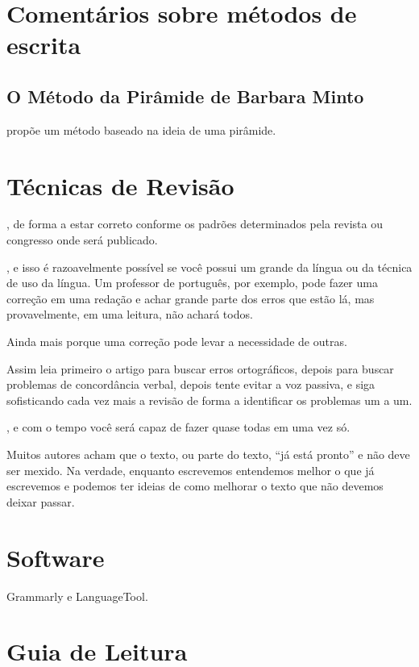 \documentclass{article}
\begin{document}
\section{Comentários sobre métodos de escrita}

\subsection{O Método da Pirâmide de Barbara Minto}

\citet{minto2009pyramid} propõe um método baseado na ideia de uma pirâmide.


\section{Técnicas de Revisão}

, de forma a estar correto conforme os padrões determinados pela revista ou congresso onde será publicado.

, e isso é razoavelmente possível se você possui um grande da língua ou da técnica de uso da língua. Um professor de português, por exemplo, pode fazer uma correção em uma redação e achar grande parte dos erros que estão lá, mas provavelmente, em uma leitura, não achará todos.

 Ainda mais porque uma correção pode levar a necessidade de outras.

 Assim leia primeiro o artigo para buscar erros ortográficos, depois para buscar problemas de concordância verbal, depois tente evitar a voz passiva, e siga sofisticando cada vez mais a revisão de forma a identificar os problemas um a um.

, e com o tempo você será capaz de fazer quase todas em uma vez só. 


 Muitos autores acham que o texto, ou parte do texto, ``já está pronto'' e não deve ser mexido. Na verdade, enquanto escrevemos entendemos melhor o que já escrevemos e podemos ter ideias de como melhorar o texto que não devemos deixar passar.

\section{Software}
\label{sec:software}
Grammarly e LanguageTool.

\section{Guia de Leitura}

\printbibliography

\newpage

\listofsubjects
\end{document}
